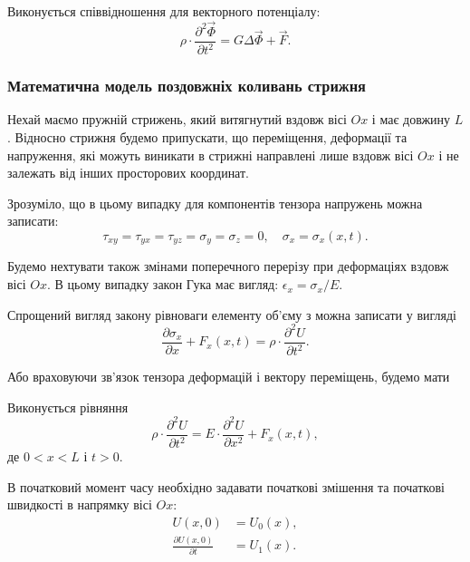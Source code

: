 \begin{th_equation}
	Виконується співвідношення для векторного потенціалу:
	\begin{equation}
		\rho \cdot \frac{\partial^2 \vec \Phi}{\partial t^2} = G \Delta  \vec \Phi + \vec F.
	\end{equation}
\end{th_equation}

\subsubsection{Математична модель поздовжніх коливань стрижня}

Нехай маємо пружній стрижень, який витягнутий вздовж вісі $Ox$ і має довжину $L$. Відносно стрижня будемо припускати, що переміщення, деформації та напруження, які можуть виникати в стрижні направлені лише вздовж вісі $Ox$ і не залежать від інших просторових координат. \medskip

Зрозуміло, що в цьому випадку для компонентів тензора напружень можна записати: 
\begin{equation}
	\tau_{x y} = \tau_{y x} = \tau_{y z} = \sigma_y = \sigma_z = 0, \quad \sigma_x = \sigma_x(x, t).
\end{equation}

Будемо нехтувати також змінами поперечного перерізу при деформаціях вздовж вісі $Ox$. В цьому випадку закон Гука має вигляд: $\epsilon_x = \sigma_x / E$. \medskip

Спрощений вигляд закону рівноваги елементу об'єму з можна записати у вигляді
\begin{equation}
	\frac{\partial \sigma_x}{\partial x} + F_x(x, t) = \rho \cdot \frac{\partial^2 U}{\partial t^2}.
\end{equation}

Або враховуючи зв'язок тензора деформацій і вектору переміщень, будемо мати 
\begin{th_equation}
	Виконується рівняння
	\begin{equation}
		\rho \cdot \frac{\partial^2 U}{\partial t^2} = E \cdot \frac{\partial^2 U}{\partial x^2} + F_x(x, t),
	\end{equation}
	де $0 < x < L$ і $t > 0$.
\end{th_equation}

В початковий момент часу необхідно задавати початкові змішення та початкові швидкості в напрямку вісі $Ox$:
\begin{align}
	U(x, 0) &= U_0(x), \\
	\frac{\partial U(x, 0)}{\partial t} &= U_1(x).
\end{align}

